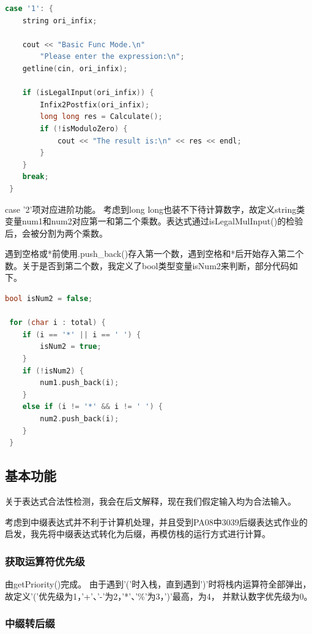 \documentclass[a4paper, 11pt, UTF8]{ctexart}
\begin{document}
\begin{lstlisting}[language=C++, basicstyle=\ttfamily]
 case '1': {
    string ori_infix;

    cout << "Basic Func Mode.\n"
        "Please enter the expression:\n";
    getline(cin, ori_infix);

    if (isLegalInput(ori_infix)) {
        Infix2Postfix(ori_infix);
        long long res = Calculate();
        if (!isModuloZero) {
            cout << "The result is:\n" << res << endl;
        }
    }
    break;
 }   
\end{lstlisting}

case '2'项对应进阶功能。
考虑到long long也装不下待计算数字，故定义string类变量num1和num2对应第一和第二个乘数。表达式通过isLegalMulInput()的检验后，会被分割为两个乘数。

遇到空格或*前使用.push\_back()存入第一个数，遇到空格和*后开始存入第二个数。关于是否到第二个数，我定义了bool类型变量isNum2来判断，部分代码如下。

\begin{lstlisting}[language=C++, basicstyle=\ttfamily]
 bool isNum2 = false;

 for (char i : total) {
	if (i == '*' || i == ' ') {
		isNum2 = true;
	}
	if (!isNum2) {
		num1.push_back(i);
	}
	else if (i != '*' && i != ' ') {
		num2.push_back(i);
	}
 }
\end{lstlisting}

\subsection{基本功能}

关于表达式合法性检测，我会在后文解释，现在我们假定输入均为合法输入。

考虑到中缀表达式并不利于计算机处理，并且受到PA08中3039后缀表达式作业的启发，我先将中缀表达式转化为后缀，再模仿栈的运行方式进行计算。

\subsubsection{获取运算符优先级}

由getPriority()完成。
由于遇到'('时入栈，直到遇到')'时将栈内运算符全部弹出，故定义'('优先级为1，'+'、'-'为2，'*'、'\%'为3，')'最高，为4，
并默认数字优先级为0。

\subsubsection{中缀转后缀}
\end{document}
